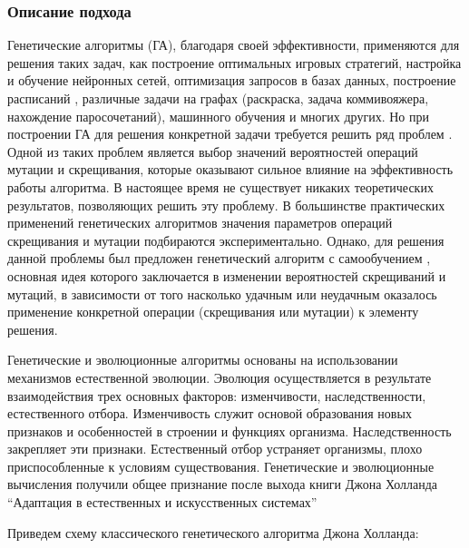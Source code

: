 \documentclass{article}
\begin{document}
\subsubsection{Описание подхода}
Генетические алгоритмы (ГА), благодаря своей эффективности, применяются для решения таких задач, как построение оптимальных игровых стратегий, настройка и обучение нейронных сетей, оптимизация запросов в базах данных, построение расписаний \cite{Kostenko_2013, Kostenko_2000}, различные задачи на графах (раскраска, задача коммивояжера, нахождение паросочетаний), машинного обучения \cite{Kost_Scher_2013} и многих других. Но при построении ГА для решения конкретной задачи требуется решить ряд проблем \cite{Kostenko_2013}. Одной из таких проблем является выбор значений вероятностей операций мутации и скрещивания, которые оказывают сильное влияние на эффективность работы алгоритма. В настоящее время не существует никаких теоретических результатов, позволяющих решить эту проблему. В большинстве практических применений генетических алгоритмов значения параметров операций скрещивания и мутации подбираются экспериментально. Однако, для решения данной проблемы был предложен генетический алгоритм с самообучением \cite{Kostenko_2015}, основная идея которого заключается в изменении вероятностей скрещиваний и мутаций, в зависимости от того насколько удачным или неудачным оказалось применение конкретной операции (скрещивания или мутации) к элементу решения.\par
Генетические и эволюционные алгоритмы основаны на использовании механизмов естественной эволюции. Эволюция осуществляется в результате взаимодействия трех основных факторов: изменчивости, наследственности, естественного отбора. Изменчивость служит основой образования новых признаков и особенностей в строении и функциях организма. Наследственность закрепляет эти признаки. Естественный отбор устраняет организмы, плохо приспособленные к условиям существования. Генетические и эволюционные вычисления получили общее признание после выхода книги Джона Холланда “Адаптация в естественных и искусственных системах” \cite{Holland_1975} \par
Приведем схему классического генетического алгоритма Джона Холланда:
\end{document}
